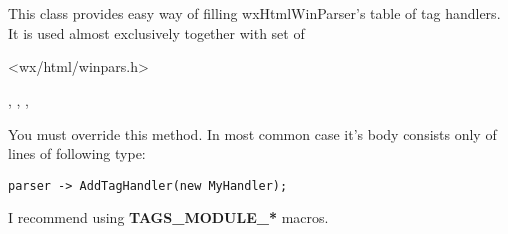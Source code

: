 %

\section{}\label{wxhtmltagsmodule}

This class provides easy way of filling wxHtmlWinParser's table of
tag handlers. It is used almost exclusively together with set of




<wx/html/winpars.h>


,
,
,


\label{wxhtmltagsmodulefillhandlerstable}


You must override this method. In most common case it's body consists
only of lines of following type:

\begin{verbatim}
parser -> AddTagHandler(new MyHandler);
\end{verbatim}

I recommend using {\bf TAGS\_MODULE\_*} macros.



